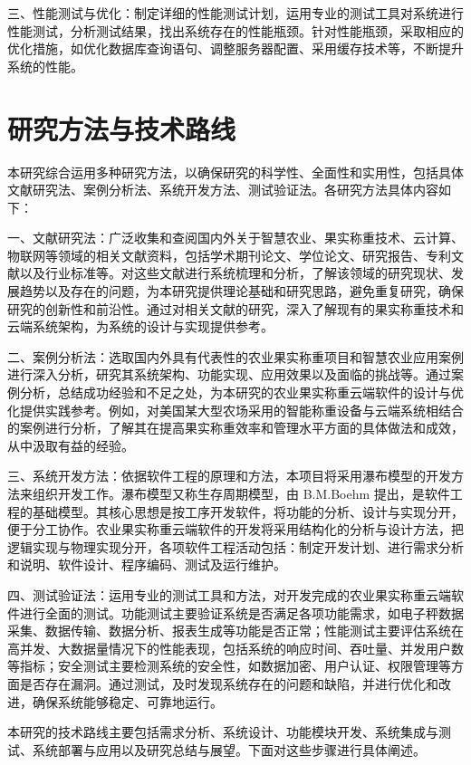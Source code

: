 三、性能测试与优化：制定详细的性能测试计划，运用专业的测试工具对系统进行性能测试，分析测试结果，找出系统存在的性能瓶颈。针对性能瓶颈，采取相应的优化措施，如优化数据库查询语句、调整服务器配置、采用缓存技术等，不断提升系统的性能。

\section{研究方法与技术路线}

本研究综合运用多种研究方法，以确保研究的科学性、全面性和实用性，包括具体文献研究法、案例分析法、系统开发方法、测试验证法。各研究方法具体内容如下：

一、文献研究法：广泛收集和查阅国内外关于智慧农业、果实称重技术、云计算、物联网等领域的相关文献资料，包括学术期刊论文、学位论文、研究报告、专利文献以及行业标准等。对这些文献进行系统梳理和分析，了解该领域的研究现状、发展趋势以及存在的问题，为本研究提供理论基础和研究思路，避免重复研究，确保研究的创新性和前沿性。通过对相关文献的研究，深入了解现有的果实称重技术和云端系统架构，为系统的设计与实现提供参考。

二、案例分析法：选取国内外具有代表性的农业果实称重项目和智慧农业应用案例进行深入分析，研究其系统架构、功能实现、应用效果以及面临的挑战等。通过案例分析，总结成功经验和不足之处，为本研究的农业果实称重云端软件的设计与优化提供实践参考。例如，对美国某大型农场采用的智能称重设备与云端系统相结合的案例\cite{Anisha2019FruitRU}进行分析，了解其在提高果实称重效率和管理水平方面的具体做法和成效，从中汲取有益的经验。

三、系统开发方法：依据软件工程的原理和方法，本项目将采用瀑布模型的开发方法来组织开发工作。瀑布模型又称生存周期模型，由 B.M.Boehm 提出，是软件工程的基础模型。其核心思想是按工序开发软件，将功能的分析、设计与实现分开，便于分工协作\cite{叶俊民2006软件工程}。农业果实称重云端软件的开发将采用结构化的分析与设计方法，把逻辑实现与物理实现分开，各项软件工程活动包括：制定开发计划、进行需求分析和说明、软件设计、程序编码、测试及运行维护。

四、测试验证法：运用专业的测试工具和方法，对开发完成的农业果实称重云端软件进行全面的测试。功能测试主要验证系统是否满足各项功能需求，如电子秤数据采集、数据传输、数据分析、报表生成等功能是否正常；性能测试主要评估系统在高并发、大数据量情况下的性能表现，包括系统的响应时间、吞吐量、并发用户数等指标；安全测试主要检测系统的安全性，如数据加密、用户认证、权限管理等方面是否存在漏洞。通过测试，及时发现系统存在的问题和缺陷，并进行优化和改进，确保系统能够稳定、可靠地运行。

本研究的技术路线主要包括需求分析、系统设计、功能模块开发、系统集成与测试、系统部署与应用以及研究总结与展望。下面对这些步骤进行具体阐述。


